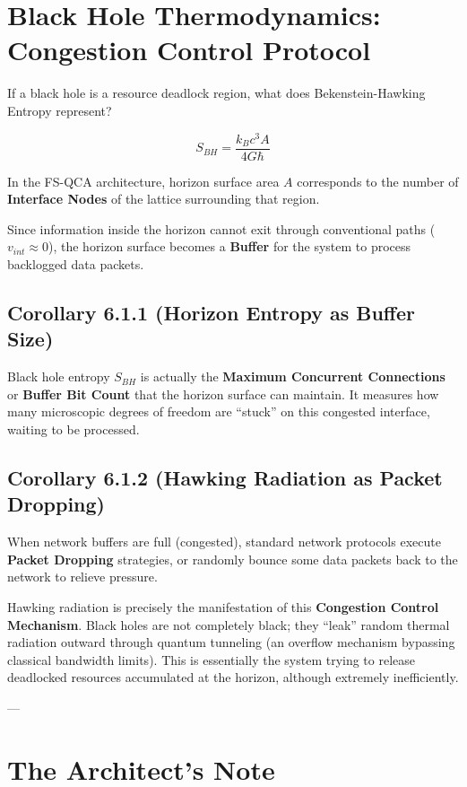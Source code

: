 \section{Black Hole Thermodynamics: Congestion Control Protocol}

If a black hole is a resource deadlock region, what does Bekenstein-Hawking Entropy represent?

$$S_{BH} = \frac{k_B c^3 A}{4 G \hbar}$$

In the FS-QCA architecture, horizon surface area \textbf{$A$} corresponds to the number of \textbf{Interface Nodes} of the lattice surrounding that region.

Since information inside the horizon cannot exit through conventional paths (\textbf{$v_{int} \approx 0$}), the horizon surface becomes a \textbf{Buffer} for the system to process backlogged data packets.

\subsection{Corollary 6.1.1 (Horizon Entropy as Buffer Size)}

Black hole entropy \textbf{$S_{BH}$} is actually the \textbf{Maximum Concurrent Connections} or \textbf{Buffer Bit Count} that the horizon surface can maintain. It measures how many microscopic degrees of freedom are ``stuck'' on this congested interface, waiting to be processed.

\subsection{Corollary 6.1.2 (Hawking Radiation as Packet Dropping)}

When network buffers are full (congested), standard network protocols execute \textbf{Packet Dropping} strategies, or randomly bounce some data packets back to the network to relieve pressure.

Hawking radiation is precisely the manifestation of this \textbf{Congestion Control Mechanism}. Black holes are not completely black; they ``leak'' random thermal radiation outward through quantum tunneling (an overflow mechanism bypassing classical bandwidth limits). This is essentially the system trying to release deadlocked resources accumulated at the horizon, although extremely inefficiently.

---

\section{The Architect's Note}

